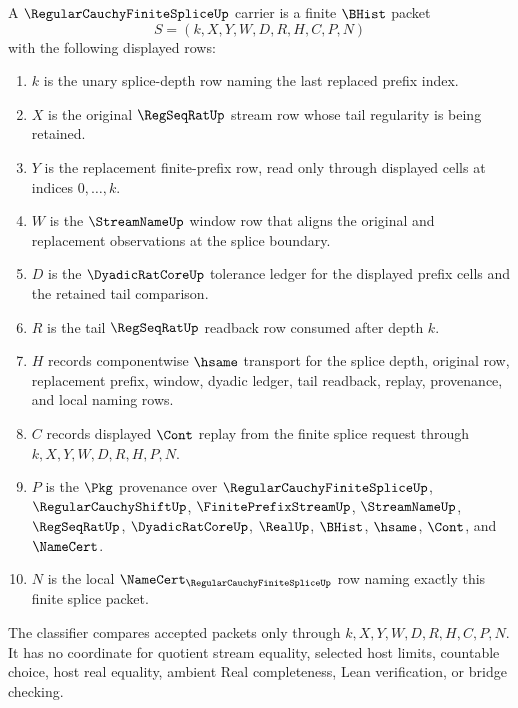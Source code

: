 \begin{definition}
\label{def:regular-cauchy-finite-splice-carrier}
A $\RegularCauchyFiniteSpliceUp$ carrier is a finite $\BHist$ packet
$$
S=(k,X,Y,W,D,R,H,C,P,N)
$$
with the following displayed rows:
\begin{enumerate}
\item $k$ is the unary splice-depth row naming the last replaced prefix index.
\item $X$ is the original $\RegSeqRatUp$ stream row whose tail regularity is being retained.
\item $Y$ is the replacement finite-prefix row, read only through displayed cells at indices $0,\ldots,k$.
\item $W$ is the $\StreamNameUp$ window row that aligns the original and replacement observations at the splice boundary.
\item $D$ is the $\DyadicRatCoreUp$ tolerance ledger for the displayed prefix cells and the retained tail comparison.
\item $R$ is the tail $\RegSeqRatUp$ readback row consumed after depth $k$.
\item $H$ records componentwise $\hsame$ transport for the splice depth, original row, replacement prefix, window, dyadic ledger, tail readback, replay, provenance, and local naming rows.
\item $C$ records displayed $\Cont$ replay from the finite splice request through $k,X,Y,W,D,R,H,P,N$.
\item $P$ is the $\Pkg$ provenance over $\RegularCauchyFiniteSpliceUp$, $\RegularCauchyShiftUp$, $\FinitePrefixStreamUp$, $\StreamNameUp$, $\RegSeqRatUp$, $\DyadicRatCoreUp$, $\RealUp$, $\BHist$, $\hsame$, $\Cont$, and $\NameCert$.
\item $N$ is the local $\NameCert_{\RegularCauchyFiniteSpliceUp}$ row naming exactly this finite splice packet.
\end{enumerate}
The classifier compares accepted packets only through $k,X,Y,W,D,R,H,C,P,N$. It has no coordinate for quotient stream equality, selected host limits, countable choice, host real equality, ambient Real completeness, Lean verification, or bridge checking.
\end{definition}

